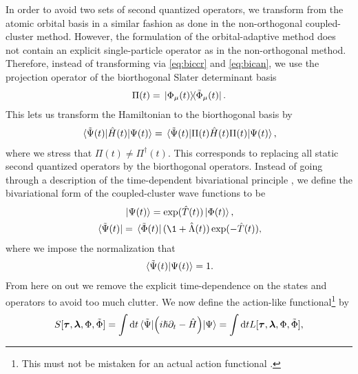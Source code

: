         In order to avoid two sets of second quantized operators, we
        transform from the atomic orbital basis in a similar fashion as done
        in the non-orthogonal coupled-cluster method.
        However, the formulation of the orbital-adaptive method does not
        contain an explicit single-particle operator as in the
        non-orthogonal method.
        Therefore, instead of transforming via \autoref{eq:biccr} and
        \autoref{eq:bican}, we use the projection operator of the
        biorthogonal Slater determinant basis \cite{kvaal2012ab}
        \begin{align}
            \Pi(t)
            = \dyad*{\slat_{\mu}(t)}{\tilde{\slat}_{\mu}(t)}.
        \end{align}
        This lets us transform the Hamiltonian to the biorthogonal basis by
        \begin{align}
            \mel*{\tilde{\Psi}(t)}{\hat{H}(t)}{\Psi(t)}
            =
            \mel*{\tilde{\Psi}(t)}{\Pi(t)\hat{H}(t)\Pi(t)}{\Psi(t)},
        \end{align}
        where we stress that $\Pi(t) \neq \Pi^{\dagger}(t)$.  This
        corresponds to replacing all static second quantized operators by
        the biorthogonal operators.
        Instead of going through a description of the time-dependent
        bivariational principle \cite{kvaal2012ab, arponen1983311}, we
        define the bivariational form of the coupled-cluster wave functions
        to be
        \begin{gather}
            \ket*{\Psi(t)} = \exponential(\clust(t))\ket*{\slat(t)}, \\
            \bra*{\tilde{\Psi}(t)}
            = \bra*{\tilde{\slat}(t)}(\1 + \clustl(t))
            \exponential(-\clust(t)),
        \end{gather}
        where we impose the normalization that
        \begin{align}
            \braket*{\tilde{\Psi}(t)}{\Psi(t)} = 1.
        \end{align}
        From here on out we remove the explicit time-dependence on the
        states and operators to avoid too much clutter.
        We now define the action-like functional\footnote{%
            This must not be mistaken for an actual action functional
            \cite{arponen1983311}.
        } by \cite{kvaal2012ab, arponen1983311}
        \begin{align}
            S[\boldsymbol{\tau}, \boldsymbol{\lambda}, \Phi, \tilde{\Phi}]
            =
            \int \dd t
            \mel*{\tilde{\Psi}}{
                \left( 
                    i\hslash\partial_t - \hat{H}
                 \right)
            }{\Psi}
            =
            \int \dd t
            L[\boldsymbol{\tau}, \boldsymbol{\lambda}, \Phi, \tilde{\Phi}],
            \label{eq:oacc-action-functional}
        \end{align}

